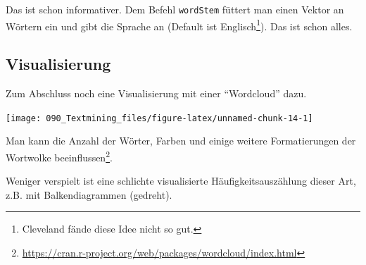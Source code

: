 \documentclass[12pt,]{book}
\makeatletter
\newenvironment{Shaded}{\begin{snugshade}}{\end{snugshade}}
\newcommand{\KeywordTok}[1]{\textcolor[rgb]{0.13,0.29,0.53}{\textbf{{#1}}}}
\newcommand{\DataTypeTok}[1]{\textcolor[rgb]{0.13,0.29,0.53}{{#1}}}
\newcommand{\DecValTok}[1]{\textcolor[rgb]{0.00,0.00,0.81}{{#1}}}
\newcommand{\StringTok}[1]{\textcolor[rgb]{0.31,0.60,0.02}{{#1}}}
\newcommand{\NormalTok}[1]{{#1}}
\newenvironment{kframe}{%
\medskip{}
\setlength{\fboxsep}{.8em}
 \def\at@end@of@kframe{}%
 \ifinner\ifhmode%
  \def\at@end@of@kframe{\end{minipage}}%
  \begin{minipage}{\columnwidth}%
 \fi\fi%
 \def\FrameCommand##1{\hskip\@totalleftmargin \hskip-\fboxsep
 \colorbox{shadecolor}{##1}\hskip-\fboxsep
     \hskip-\linewidth \hskip-\@totalleftmargin \hskip\columnwidth}%
 \MakeFramed {\advance\hsize-\width
   \@totalleftmargin\z@ \linewidth\hsize
   \@setminipage}}%
 {\par\unskip\endMakeFramed%
 \at@end@of@kframe}
\renewenvironment{Shaded}{\begin{kframe}}{\end{kframe}}
\makeatother
\begin{document}
Das ist schon informativer. Dem Befehl \texttt{wordStem} füttert man
einen Vektor an Wörtern ein und gibt die Sprache an (Default ist
Englisch\footnote{Cleveland fände diese Idee nicht so gut.}). Das ist
schon alles.

\subsection{Visualisierung}\label{visualisierung-1}

Zum Abschluss noch eine Visualisierung mit einer ``Wordcloud'' dazu.

\begin{Shaded}
\end{Shaded}

\begin{center}\texttt{[image: 090\_Textmining\_files/figure-latex/unnamed-chunk-14-1]} \end{center}

Man kann die Anzahl der Wörter, Farben und einige weitere Formatierungen
der Wortwolke beeinflussen\footnote{\url{https://cran.r-project.org/web/packages/wordcloud/index.html}}.

Weniger verspielt ist eine schlichte visualisierte Häufigkeitsauszählung
dieser Art, z.B. mit Balkendiagrammen (gedreht).
\end{document}
